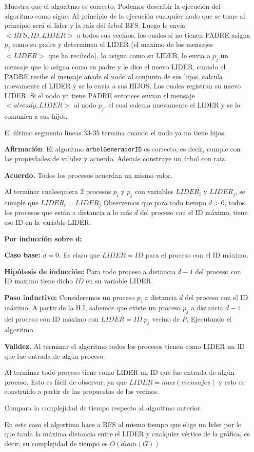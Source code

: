 Muestra que el algoritmo es correcto.
Podemos describir la ejecución del algoritmo como sigue:
Al principio de la ejecución cualquier nodo que se tome al principio será el lider y la raíz del árbol BFS. Luego le envia $<BFS,ID,LIDER>$ a todos sus vecinos, los cuales si no tienen PADRE asigna $p_j$ como su padre y determinan el LIDER (el maximo de los mensajes $<LIDER>$ que ha recibido), lo asigna como su LIDER, le envia a $p_j$ un mensaje que lo asigna como su padre y le dice el nuevo LIDER, cuando el PADRE recibe el mensaje añade el nodo al conjunto de sus hijos, calcula nuevamente el LIDER y se lo envia a sus HIJOS. Los cuales registran su nuevo LIDER. Si el nodo ya tiene PADRE entonces envian el mensaje $<already,LIDER>$ al nodo $p_j$, el cual calcula nuevamente el LIDER y se lo comunica a sus hijos.

El último segmento lineas 33-35 termina cuando el nodo ya no tiene hijos.

\textbf{Afirmación}: El algoritmo {\tt arbolGeneradorID} es correcto, es decir, cumple con las propiedades de validez y acuerdo. Además construye un árbol con raiz.

\textbf{Acuerdo.} Todos los procesos acuerdan un mismo valor.

Al terminar cualesquiera 2 procesos $p_i$ y $p_j$ con variables $LIDER_i$ y $LIDER_j$, se cumple que $LIDER_i=LIDER_j$ Observemos que para todo tiempo $d>0$, todos los procesos que están a distancia a lo más $d$ del proceso con el ID máximo, tiene ese ID en la variable LIDER.

\textbf{Por inducción sobre d:}

\textbf{Caso base:} $d=0$. Es claro que $LIDER=ID$ para el proceso con el ID máximo.

\textbf{Hipótesis de inducción:} Para todo proceso a distancia $d-1$ del proceso con ID maximo tiene dicho $ID$ en su variable LIDER.

\textbf{Paso inductivo:}
Consideremos un proceso $p_i$ a distancia $d$ del proceso con el ID máximo. A partir de la H.I, sabemos que existe un proceso $p_j$ a distancia $d-1$ del proceso con ID máximo con $LIDER = ID.p_j$ vecino de $P_i$
Ejecutando el algoritmo


\textbf{Validez.} Al terminar el algoritmo todos los procesos tienen como LIDER un ID que fue entrada de algún proceso.

Al terminar todo proceso tiene como LIDER un ID que fue entrada de algún proceso. Esto es fácil de observar, ya que $LIDER=max(mensajes)$ y esto es construido a partir de las propuestas de los vecinos.


Compara la complejidad de tiempo respecto al algoritmo anterior.

En este caso el algortimo hace a BFS al mismo tiempo que elige un lider por lo que tarda la máxima distancia entre el LIDER y cualquier vértice de la gráfica, es decir, su complejidad de tiempo es $O(diam(G))$